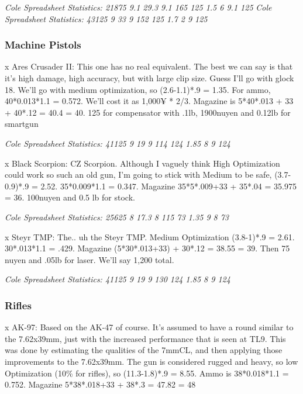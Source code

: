 \begin{multicols*}{2}
	\textit{\textcolor{OliveGreen}{Cole Spreadsheet Statistics: 21875 9.1 29.3 9.1 165 125 1.5 6 9.1 125}}
	\textit{\textcolor{OliveGreen}{Cole Spreadsheet Statistics: 43125 9 33 9 152 125 1.7 2 9 125}}
	
	\subsubsection{Machine Pistols}
	
	x Ares Crusader II: This one has no real equivalent. The best we can say is that it's high damage, high accuracy, but with large clip size. Guess I'll go with glock 18. We'll go with medium optimization, so (2.6-1.1)*.9 = 1.35. For ammo, 40*0.013*1.1 = 0.572. We'll cost it as 1,000¥ * 2/3. Magazine is 5*40*.013 + 33 + 40*.12 = 40.4 = 40. 125 for compensator with .1lb, 1900nuyen and 0.12lb for smartgun
	
	\textit{\textcolor{OliveGreen}{Cole Spreadsheet Statistics: 41125 9 19 9 114 124 1.85 8 9 124}}
	
	x Black Scorpion: CZ Scorpion. Although I vaguely think High Optimization could work so such an old gun, I'm going to stick with Medium to be safe, (3.7-0.9)*.9 = 2.52. 35*0.009*1.1 = 0.347. Magazine 35*5*.009+33 + 35*.04 = 35.975 = 36. 100nuyen and 0.5 lb for stock.
	
	\textit{\textcolor{OliveGreen}{Cole Spreadsheet Statistics: 25625 8 17.3 8 115 73 1.35 9 8 73}}
	
	x Steyr TMP: The.. uh the Steyr TMP. Medium Optimization (3.8-1)*.9 = 2.61. 30*.013*1.1 = .429. Magazine (5*30*.013+33) + 30*.12 = 38.55 = 39. Then 75 nuyen and .05lb for laser. We'll say 1,200 total.
	
	\textit{\textcolor{OliveGreen}{Cole Spreadsheet Statistics: 41125 9 19 9 130 124 1.85 8 9 124}}
	
	\subsubsection{Rifles}
	
	x AK-97: Based on the AK-47 of course. It's assumed to have a round similar to the 7.62x39mm, just with the increased performance that is seen at TL9. This was done by estimating the qualities of the 7mmCL, and then applying those improvements to the 7.62x39mm. The gun is considered rugged and heavy, so low Optimization (10\% for rifles), so (11.3-1.8)*.9 = 8.55. Ammo is 38*0.018*1.1 = 0.752. Magazine 5*38*.018+33 + 38*.3 = 47.82 = 48
	

\end{multicols*}
